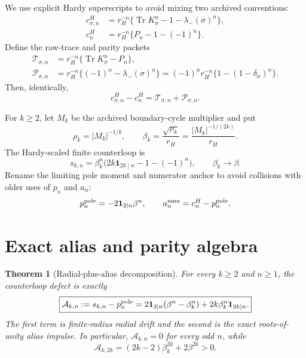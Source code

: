 \documentclass[11pt]{article}
\newtheorem{theorem}{Theorem}[section]
\theoremstyle{remark}
\newcommand{\Tr}{\operatorname{Tr}}
\newcommand{\1}{\mathbf 1}
\newcommand{\cA}{\mathcal A}
\newcommand{\cP}{\mathcal P}
\newcommand{\cT}{\mathcal T}
\begin{document}
We use explicit Hardy superscripts to avoid mixing two archived conventions:
\begin{align}
 c^H_{\sigma,n}
 &=r_H^{-n}\{\Tr K_\sigma^n-1-\lambda_-(\sigma)^n\},
 \label{eq:noisy-hardy}\\
 c^H_n
 &=r_H^{-n}\{P_n-1-(-1)^n\}.
 \label{eq:det-hardy}
\end{align}
Define the raw-trace and parity packets
\begin{align}
 \cT_{\sigma,n}
 &=r_H^{-n}\{\Tr K_\sigma^n-P_n\},
 \label{eq:raw-packet}\\
 \cP_{\sigma,n}
 &=r_H^{-n}\{(-1)^n-\lambda_-(\sigma)^n\}
 =(-1)^nr_H^{-n}\{1-(1-\delta_\sigma)^n\}.
 \label{eq:parity-packet}
\end{align}
Then, identically,
\begin{equation}
 c^H_{\sigma,n}-c^H_n=\cT_{\sigma,n}+\cP_{\sigma,n}.
 \label{eq:bulk-split}
\end{equation}

For $k\ge2$, let $M_k$ be the archived boundary-cycle multiplier and put
\begin{equation}
 \rho_k=|M_k|^{-1/k},
 \qquad
 \beta_k=\frac{\sqrt{\rho_k}}{r_H}
 =\frac{|M_k|^{-1/(2k)}}{r_H}.
 \label{eq:beta-type}
\end{equation}
The Hardy-scaled finite counterloop is
\begin{equation}
 s_{k,n}=\beta_k^n
 \bigl(2k\1_{2k\mid n}-1-(-1)^n\bigr),
 \qquad \beta_k\longrightarrow\beta.
 \label{eq:counterloop}
\end{equation}
Rename the limiting pole moment and numerator anchor to avoid collisions with
older uses of $p_n$ and $a_n$:
\begin{equation}
 p_n^{\rm pole}=-2\1_{2\mid n}\beta^n,
 \qquad
 a_n^{\rm num}=c^H_n-p_n^{\rm pole}.
 \label{eq:pole-anchor}
\end{equation}

\section{Exact alias and parity algebra}

\begin{theorem}[Radial-plus-alias decomposition]
\label{thm:counterloop-split}
For every $k\ge2$ and $n\ge1$, the counterloop defect is exactly
\begin{equation}
 \boxed{
 \cA_{k,n}:=s_{k,n}-p_n^{\rm pole}
 =2\1_{2\mid n}(\beta^n-\beta_k^n)
 +2k\beta_k^n\1_{2k\mid n}.}
 \label{eq:counterloop-split}
\end{equation}
The first term is finite-radius radial drift and the second is the exact
roots-of-unity alias impulse.  In particular, $\cA_{k,n}=0$ for every odd
$n$, while
\begin{equation}
 \cA_{k,2k}=(2k-2)\beta_k^{2k}+2\beta^{2k}>0.
 \label{eq:first-alias-defect}
\end{equation}
\end{theorem}
\end{document}
